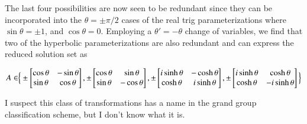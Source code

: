 The last four possibilities are now seen to be redundant since they can be incorporated into the $\theta = \pm \pi/2$ cases of the real trig parameterizations where $\sin\theta = \pm 1$, and $\cos\theta = 0$.   Employing a $\theta' = -\theta$ change of variables, we find that two of the hyperbolic parameterizations are also redundant and can express the reduced solution set as

\begin{align}\label{eqn:quadratricForm:voo19}
A \in \Bigr\{
\pm \begin{bmatrix}
\cos\theta & - \sin\theta \\
\sin\theta & \cos\theta \\
\end{bmatrix}, 
\pm \begin{bmatrix}
\cos\theta & \sin\theta \\
\sin\theta & - \cos\theta \\
\end{bmatrix}, 
\pm \begin{bmatrix}
i \sinh\theta & -\cosh\theta \\
\cosh\theta  & i \sinh\theta \\
\end{bmatrix}, 
\pm \begin{bmatrix}
i \sinh\theta & \cosh\theta \\
\cosh\theta  & - i \sinh\theta \\
\end{bmatrix}
\Bigl\}
\end{align}

I suspect this class of transformations has a name in the grand group classification scheme, but I don't know what it is.

\EndNoBibArticle
